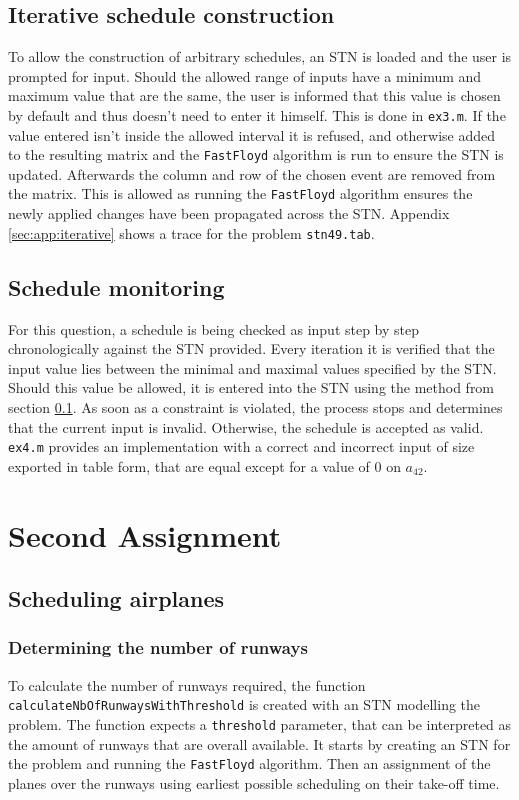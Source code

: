 \documentclass[10pt,a4paper]{article}
\begin{document}
\subsection{Iterative schedule construction}
\label{sec:iterative}
To allow the construction of arbitrary schedules, an STN is loaded and the user is prompted for input. Should the allowed range of inputs have a minimum and maximum value that are the same, the user is informed that this value is chosen by default and thus doesn't need to enter it himself. This is done in \texttt{ex3.m}. If the value entered isn't inside the allowed interval it is refused, and otherwise added to the resulting matrix and the \texttt{FastFloyd} algorithm is run to ensure the STN is updated. Afterwards the column and row of the chosen event are removed from the matrix. This is allowed as running the \texttt{FastFloyd} algorithm ensures the newly applied changes have been propagated across the STN. Appendix \ref{sec:app:iterative} shows a trace for the problem \texttt{stn49.tab}. 

\subsection{Schedule monitoring}
For this question, a schedule is being checked as input step by step chronologically against the STN provided. Every iteration it is verified that the input value lies between the minimal and maximal values specified by the STN. Should this value be allowed, it is entered into the STN using the method from section \ref{sec:iterative}. As soon as a constraint is violated, the process stops and determines that the current input is invalid. Otherwise, the schedule is accepted as valid. \texttt{ex4.m} provides an implementation with a correct and incorrect input of size exported in table form, that are equal except for a value of 0 on $a_{42}$.

\section{Second Assignment}
\subsection{Scheduling airplanes}
\subsubsection{Determining the number of runways}
\label{sec:nb_of_runways}
To calculate the number of runways required, the function  \texttt{calculate\-Nb\-Of\-Run\-ways\-With\-Thres\-hold} is created with an STN modelling the problem. The function expects a \texttt{threshold} parameter, that can be interpreted as the amount of runways that are overall available. It starts by creating an STN for the problem and running the \texttt{FastFloyd} algorithm. Then an assignment of the planes over the runways using earliest possible scheduling on their take-off time.
\end{document}
